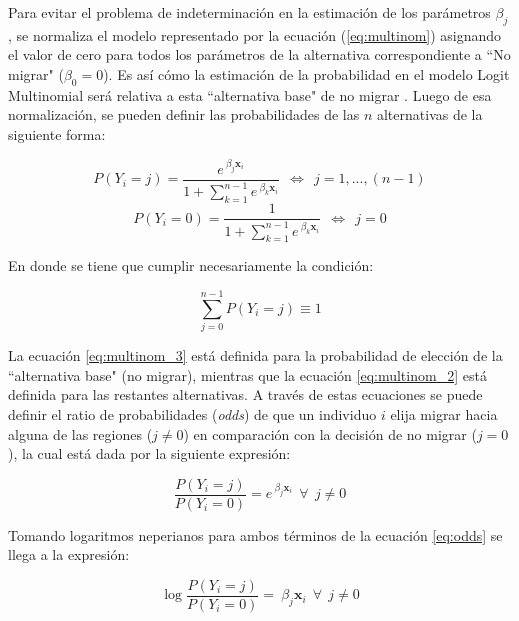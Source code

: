 \documentclass[12pt,a4paper]{article}
\begin{document}
Para evitar el problema de indeterminación en la estimación de los parámetros $\beta_{j}$, se normaliza el modelo representado por la ecuación (\ref{eq:multinom}) asignando el valor de cero para todos los parámetros de la alternativa correspondiente a ``No migrar" ($\beta_{0}=0$). Es así cómo la estimación de la probabilidad en el modelo Logit Multinomial será relativa a esta ``alternativa base"  de no migrar \parencite{coxhead_migration_2015}.
Luego de esa normalización, se pueden definir las probabilidades de las $n$ alternativas de la siguiente forma:
\begin {center}
\begin{equation}\label{eq:multinom_2}
P{(Y_{i}=j)}=\frac{e^{\ \beta_{j} \textbf{x}_{i}}}{1+\sum_{k=1}^{n-1}e^{\ \beta_{k} \textbf{x}_{i}}} \ \ \Leftrightarrow \ \ j=1,...,(n-1)
\end{equation}
\begin{equation}\label{eq:multinom_3}
P{(Y_{i}=0)}=\frac{1}{1+\sum_{k=1}^{n-1}e^{\ \beta_{k} \textbf{x}_{i}}} \ \ \Leftrightarrow \ \ j=0
\end{equation}
\end {center}

En donde se tiene que cumplir necesariamente la condición:
\begin {center}
\begin{equation}\label{eq:multinom_4}
\sum_{j=0}^{n-1}P{(Y_{i}=j)}\equiv1
\end{equation}
\end {center}

La ecuación \ref{eq:multinom_3} está definida para la probabilidad de elección de la ``alternativa base" (no migrar), mientras que la ecuación \ref{eq:multinom_2} está definida para las restantes alternativas. A través de estas ecuaciones se puede definir el ratio de probabilidades (\textit{odds}) de que un individuo $i$ elija migrar hacia alguna de las regiones ($j\neq0$) en comparación con la decisión de no migrar ($j=0$), la cual está dada por la siguiente expresión:
\begin{center}
\begin{equation}\label{eq:odds}
\frac{P{(Y_{i}=j)}}{P{(Y_{i}=0)}}=e^{\ \beta_{j} \textbf{x}_{i}} \ \ \forall \ \ j\neq0
\end{equation}
\end {center}
Tomando logaritmos neperianos para ambos términos de la ecuación \ref{eq:odds} se llega a la expresión:
\begin{center}
\begin{equation}\label{eq:logodds}
\log\frac{P{(Y_{i}=j)}}{P{(Y_{i}=0)}}=\ \beta_{j} \textbf{x}_{i} \ \ \forall \ \ j\neq0
\end{equation}
\end {center}
\end{document}
